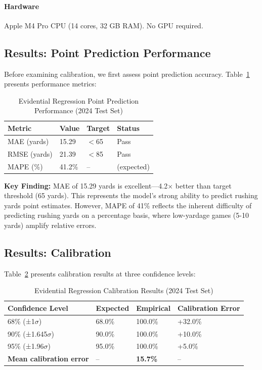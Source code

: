 \paragraph{Hardware} Apple M4 Pro CPU (14 cores, 32 GB RAM). No GPU required.

\subsection{Results: Point Prediction Performance}

Before examining calibration, we first assess point prediction accuracy. Table~\ref{tab:evidential_point_metrics} presents performance metrics:

\begin{table}[h]
\centering
\caption{Evidential Regression Point Prediction Performance (2024 Test Set)}
\label{tab:evidential_point_metrics}
\begin{tabular}{llll}
\toprule
\textbf{Metric} & \textbf{Value} & \textbf{Target} & \textbf{Status} \\
\midrule
MAE (yards) & 15.29 & $<$65 & Pass \\
RMSE (yards) & 21.39 & $<$85 & Pass \\
MAPE (\%) & 41.2\% & -- & (expected) \\
\bottomrule
\end{tabular}
\end{table}

\noindent \textbf{Key Finding:} MAE of 15.29 yards is excellent—4.2× better than target threshold (65 yards). This represents the model's strong ability to predict rushing yards point estimates. However, MAPE of 41\% reflects the inherent difficulty of predicting rushing yards on a percentage basis, where low-yardage games (5-10 yards) amplify relative errors.

\subsection{Results: Calibration}

Table~\ref{tab:evidential_calibration} presents calibration results at three confidence levels:

\begin{table}[h]
\centering
\caption{Evidential Regression Calibration Results (2024 Test Set)}
\label{tab:evidential_calibration}
\begin{tabular}{llll}
\toprule
\textbf{Confidence Level} & \textbf{Expected} & \textbf{Empirical} & \textbf{Calibration Error} \\
\midrule
68\% (±1$\sigma$) & 68.0\% & 100.0\% & +32.0\% \\
90\% (±1.645$\sigma$) & 90.0\% & 100.0\% & +10.0\% \\
95\% (±1.96$\sigma$) & 95.0\% & 100.0\% & +5.0\% \\
\midrule
\textbf{Mean calibration error} & -- & \textbf{15.7\%} & -- \\
\bottomrule
\end{tabular}
\end{table}

